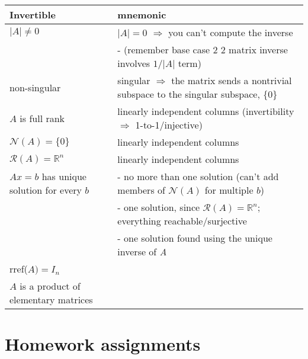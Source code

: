 \documentclass[10pt,letterpaper]{article}
\begin{document}
\begin{center}
\begin{tabular}{ll}
 Invertible                                &  mnemonic                                                                                       \\
\hline
 $\vert A\vert \ne 0$                      &  $\vert A\vert = 0$ $\Rightarrow$ you can't compute the inverse                                 \\
                                           &  - (remember base case 2 \texttimes{} 2 matrix inverse involves $1/\vert A\vert$ term)          \\
 non-singular                              &  singular $\Rightarrow$ the matrix sends a nontrivial subspace to the singular subspace, \{0\}  \\
 $A$ is full rank                          &  linearly independent columns (invertibility $\Rightarrow$ 1-to-1/injective)                    \\
 $\mathcal{N}(A)=\{0\}$                    &  linearly independent columns                                                                   \\
 $\mathcal R (A)= \mathbb{R}^{n}$          &  linearly independent columns                                                                   \\
 $Ax=b$ has unique solution for every $b$  &  - no more than one solution (can't add members of $\mathcal N (A)$ for multiple $b$)           \\
                                           &  - one solution, since $\mathcal R (A)= \mathbb{R}^{n}$; everything reachable/surjective        \\
                                           &  - one solution found using the unique inverse of \emph{A}                                      \\
 rref($A)=I_n$                             &                                                                                                 \\
 $A$ is a product of elementary matrices   &                                                                                                 \\
\end{tabular}
\end{center}
\section{Homework assignments}
\label{sec-13}
\end{document}
